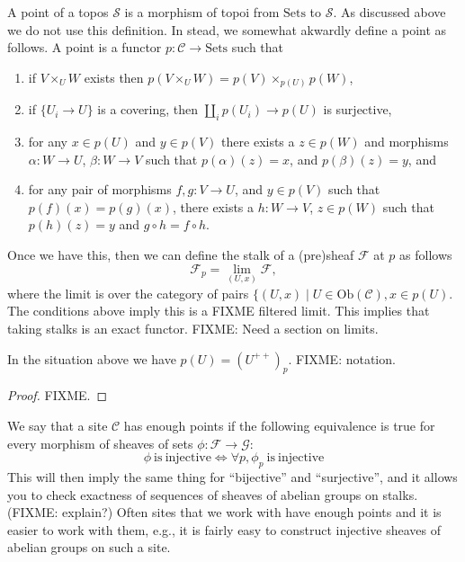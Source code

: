 \noindent
A point of a topos $\mathcal{S}$ is a morphism of topoi from $\text{Sets}$ to
$\mathcal{S}$. As discussed above we do not use this definition. In stead, we
somewhat akwardly define a point as follows. A point is a functor
$p : \mathcal{C} \to \text{Sets}$ such that
\begin{enumerate}
\item if $V\times_U W$ exists then $p(V\times_U W)=p(V)\times_{p(U)}p(W)$,
\item if $\{U_i \to U\}$ is a covering, then $\coprod_i p(U_i) \to p(U)$ is
surjective,
\item for any $x\in p(U)$ and $y\in p(V)$ there exists a $z\in p(W)$ and
morphisms $\alpha:W \to U$, $\beta:W \to V$ such that $p(\alpha)(z)=x$,
and $p(\beta)(z)=y$, and
\item for any pair of morphisms $f,g : V \to U$, and $y\in p(V)$ such
that $p(f)(x)=p(g)(x)$, there exists a $h: W \to V$, $z\in p(W)$ such that
$p(h)(z)=y$ and $g\circ h = f \circ h$.
\end{enumerate}
Once we have this, then we can define the stalk of a (pre)sheaf $\mathcal{F}$
at $p$ as follows
$$
\mathcal{F}_p = \lim_{(U,x)} \mathcal{F},
$$
where the limit is over the category of pairs 
$\{(U,x) \mid U \in \text{Ob}(\mathcal{C}), x\in p(U)$. The conditions
above imply this is a FIXME filtered limit. This implies that taking
stalks is an exact functor. FIXME: Need a section on limits.

\begin{lemma}
\label{lemma-points-recover}
In the situation above we have $p(U) = (U^{++})_p$. FIXME: notation.
\end{lemma}

\begin{proof}
FIXME.
\end{proof}

\noindent
We say that a site $\mathcal{C}$ has enough points if the following equivalence
is true for every morphism of sheaves of sets 
$\phi : \mathcal{F} \to \mathcal{G}$:
$$
\phi\ \text{is}\ \text{injective} 
\Leftrightarrow 
\forall p, \phi_p\ \text{is}\ \text{injective} 
$$
This will then imply the same thing for ``bijective'' and ``surjective'', and
it allows you to check exactness of sequences of sheaves of abelian groups
on stalks. (FIXME: explain?) Often sites that we work with have enough points
and it is easier to work with them, e.g., it is fairly easy to construct
injective sheaves of abelian groups on such a site.








